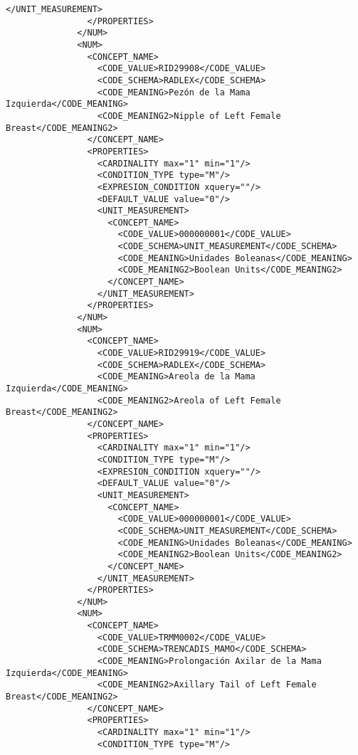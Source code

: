 \begin{lstlisting}[label=dicom-report,caption=Informe estructurado de una exploración de mama]
                  </UNIT_MEASUREMENT>
                </PROPERTIES>
              </NUM>
              <NUM>
                <CONCEPT_NAME>
                  <CODE_VALUE>RID29908</CODE_VALUE>
                  <CODE_SCHEMA>RADLEX</CODE_SCHEMA>
                  <CODE_MEANING>Pezón de la Mama Izquierda</CODE_MEANING>
                  <CODE_MEANING2>Nipple of Left Female Breast</CODE_MEANING2>
                </CONCEPT_NAME>
                <PROPERTIES>
                  <CARDINALITY max="1" min="1"/>
                  <CONDITION_TYPE type="M"/>
                  <EXPRESION_CONDITION xquery=""/>
                  <DEFAULT_VALUE value="0"/>
                  <UNIT_MEASUREMENT>
                    <CONCEPT_NAME>
                      <CODE_VALUE>000000001</CODE_VALUE>
                      <CODE_SCHEMA>UNIT_MEASUREMENT</CODE_SCHEMA>
                      <CODE_MEANING>Unidades Boleanas</CODE_MEANING>
                      <CODE_MEANING2>Boolean Units</CODE_MEANING2>
                    </CONCEPT_NAME>
                  </UNIT_MEASUREMENT>
                </PROPERTIES>
              </NUM>
              <NUM>
                <CONCEPT_NAME>
                  <CODE_VALUE>RID29919</CODE_VALUE>
                  <CODE_SCHEMA>RADLEX</CODE_SCHEMA>
                  <CODE_MEANING>Areola de la Mama Izquierda</CODE_MEANING>
                  <CODE_MEANING2>Areola of Left Female Breast</CODE_MEANING2>
                </CONCEPT_NAME>
                <PROPERTIES>
                  <CARDINALITY max="1" min="1"/>
                  <CONDITION_TYPE type="M"/>
                  <EXPRESION_CONDITION xquery=""/>
                  <DEFAULT_VALUE value="0"/>
                  <UNIT_MEASUREMENT>
                    <CONCEPT_NAME>
                      <CODE_VALUE>000000001</CODE_VALUE>
                      <CODE_SCHEMA>UNIT_MEASUREMENT</CODE_SCHEMA>
                      <CODE_MEANING>Unidades Boleanas</CODE_MEANING>
                      <CODE_MEANING2>Boolean Units</CODE_MEANING2>
                    </CONCEPT_NAME>
                  </UNIT_MEASUREMENT>
                </PROPERTIES>
              </NUM>
              <NUM>
                <CONCEPT_NAME>
                  <CODE_VALUE>TRMM0002</CODE_VALUE>
                  <CODE_SCHEMA>TRENCADIS_MAMO</CODE_SCHEMA>
                  <CODE_MEANING>Prolongación Axilar de la Mama Izquierda</CODE_MEANING>
                  <CODE_MEANING2>Axillary Tail of Left Female Breast</CODE_MEANING2>
                </CONCEPT_NAME>
                <PROPERTIES>
                  <CARDINALITY max="1" min="1"/>
                  <CONDITION_TYPE type="M"/>

\end{lstlisting}
